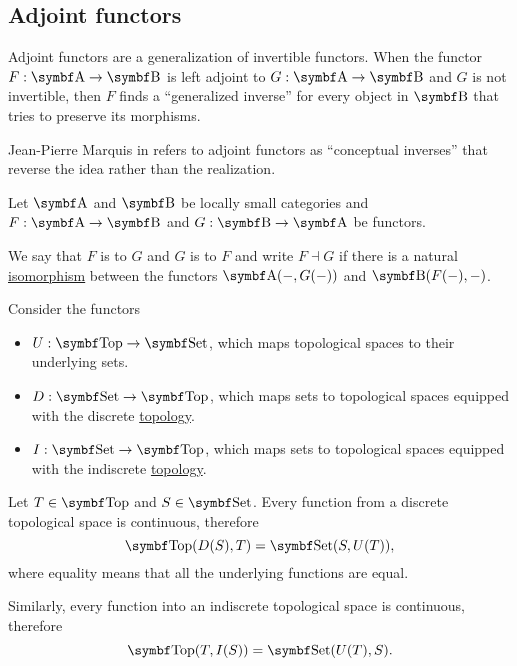 \subsection{Adjoint functors}\label{subsec:adjoint_functors}

\begin{Remark}\label{def:adjoint_functors}
  Adjoint functors are a generalization of invertible functors. When the functor \( F: \Cat{A} \to \Bold B \) is left adjoint to \( G: \Cat{A} \to \Bold B \) and \( G \) is not invertible, then \( F \) finds a \enquote{generalized inverse} for every object in \( \Bold B \) that tries to preserve its morphisms.

  Jean-Pierre Marquis in \cite{StanfordPlato:category_theory} refers to adjoint functors as \enquote{conceptual inverses} that reverse the idea rather than the realization.
\end{Remark}

\begin{Definition}\label{def:adjoint_functor}\cite[exercise 4.1.32]{Leinster2014}
  Let \( \Cat{A} \) and \( \Bold B \) be locally small categories and \( F: \Cat{A} \to \Bold B \) and \( G: \Bold B \to \Cat{A} \) be functors.

  We say that \( F \) is  to \( G \) and \( G \) is  to \( F \) and write \( F \dashv G \) if there is a natural \hyperref[def:natural_isomorpism]{isomorphism} between the functors \( \Cat{A}(-, G(-)) \) and \( \Cat{B}(F(-), -) \).
\end{Definition}

\begin{Example}\label{ex:top_adjoint_functor}\cite[example 2.1.5]{Leinster2014}
  Consider the functors
  \begin{itemize}
    \item \( U: \Cat{Top} \to \Cat{Set} \), which maps topological spaces to their underlying sets.
    \item \( D: \Cat{Set} \to \Cat{Top} \), which maps sets to topological spaces equipped with the discrete \hyperref[def:standard_topologies/discrete]{topology}.
    \item \( I: \Cat{Set} \to \Cat{Top} \), which maps sets to topological spaces equipped with the indiscrete \hyperref[def:standard_topologies/indiscrete]{topology}.
  \end{itemize}

  Let \( T \in \Cat{Top} \) and \( S \in \Cat{Set} \). Every function from a discrete topological space is continuous, therefore
  \begin{equation*}
    \Cat{Top}(D(S), T) = \Cat{Set}(S, U(T)),
  \end{equation*}
  where equality means that all the underlying functions are equal.

  Similarly, every function into an indiscrete topological space is continuous, therefore
  \begin{equation*}
    \Cat{Top}(T, I(S)) = \Cat{Set}(U(T), S).
  \end{equation*}
\end{Example}

